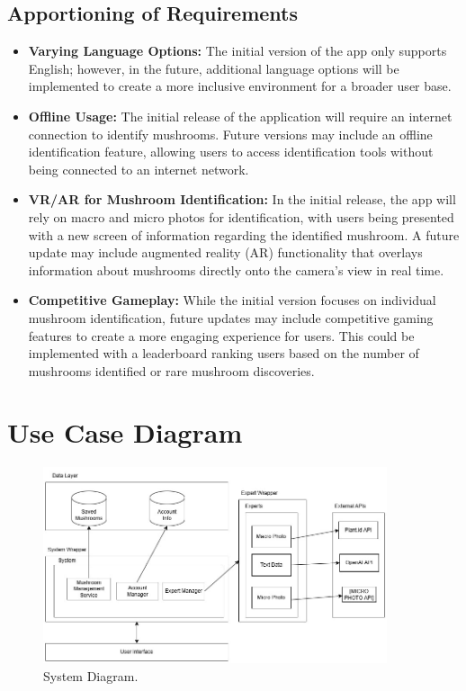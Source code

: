\documentclass[]{article}
\begin{document}
\subsection{Apportioning of Requirements}
\label{sub:apportioning_of_requirements}
\begin{itemize}
	\item \textbf{Varying Language Options:} The initial version of the app only supports English; however, in the future, additional language options will be implemented to create a more inclusive environment for a broader user base.
	\item \textbf{Offline Usage:} The initial release of the application will require an internet connection to identify mushrooms. Future versions may include an offline identification feature, allowing users to access identification tools without being connected to an internet network.
	\item \textbf{VR/AR for Mushroom Identification:} In the initial release, the app will rely on macro and micro photos for identification, with users being presented with a new screen of information regarding the identified mushroom. A future update may include augmented reality (AR) functionality that overlays information about mushrooms directly onto the camera’s view in real time.
	\item \textbf{Competitive Gameplay:} While the initial version focuses on individual mushroom identification, future updates may include competitive gaming features to create a more engaging experience for users. This could be implemented with a leaderboard ranking users based on the number of mushrooms identified or rare mushroom discoveries.
\end{itemize}

\section{Use Case Diagram}
\label{sec:use_case_diagram}
\begin{figure}[h!]
    \centering
    \includegraphics[width=0.9\textwidth]{BlockDiagram.jpg}
    \caption{System Diagram.}
    \label{fig:example}
\end{figure}
\end{document}
